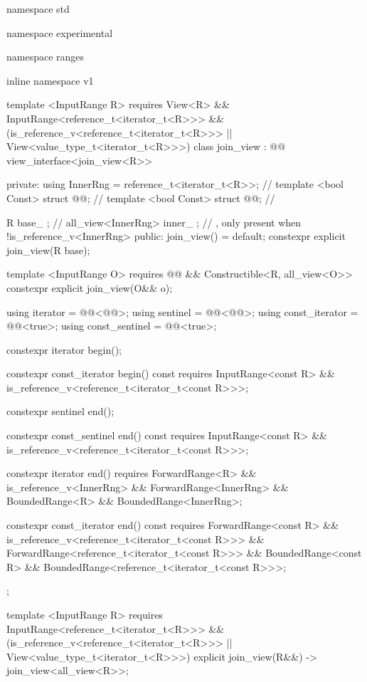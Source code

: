 \begin{codeblock}
namespace std { namespace experimental { namespace ranges { inline namespace v1 {
  template <InputRange R>
      requires View<R> && InputRange<reference_t<iterator_t<R>>> &&
          (is_reference_v<reference_t<iterator_t<R>>> ||
          View<value_type_t<iterator_t<R>>>)
  class join_view : @@ view_interface<join_view<R>> {
  private:
    using InnerRng = reference_t<iterator_t<R>>; // \expos
    template <bool Const>
      struct @@; // \expos
    template <bool Const>
      struct @@; // \expos

    R base_ {}; // \expos
    all_view<InnerRng> inner_ {}; // \expos, only present when !is_reference_v<InnerRng>
  public:
    join_view() = default;
    constexpr explicit join_view(R base);

    template <InputRange O>
        requires @@ &&
            Constructible<R, all_view<O>>
      constexpr explicit join_view(O&& o);

    using iterator = @@<@@>;
    using sentinel = @@<@@>;
    using const_iterator = @@<true>;
    using const_sentinel = @@<true>;

    constexpr iterator begin();

    constexpr const_iterator begin() const requires InputRange<const R> &&
        is_reference_v<reference_t<iterator_t<const R>>>;

    constexpr sentinel end();

    constexpr const_sentinel end() const requires InputRange<const R> &&
        is_reference_v<reference_t<iterator_t<const R>>>;

    constexpr iterator end() requires ForwardRange<R> &&
        is_reference_v<InnerRng> && ForwardRange<InnerRng> &&
        BoundedRange<R> && BoundedRange<InnerRng>;

    constexpr const_iterator end() const requires ForwardRange<const R> &&
        is_reference_v<reference_t<iterator_t<const R>>> &&
        ForwardRange<reference_t<iterator_t<const R>>> &&
        BoundedRange<const R> && BoundedRange<reference_t<iterator_t<const R>>>;
  };

  template <InputRange R>
      requires InputRange<reference_t<iterator_t<R>>> &&
          (is_reference_v<reference_t<iterator_t<R>>> ||
          View<value_type_t<iterator_t<R>>>)
    explicit join_view(R&&) -> join_view<all_view<R>>;
}}}}
\end{codeblock}

